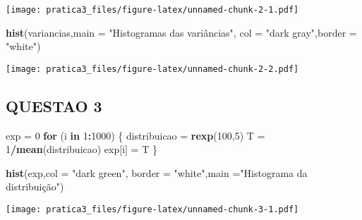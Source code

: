 \documentclass[]{article}
\newenvironment{Shaded}{\begin{snugshade}}{\end{snugshade}}
\newcommand{\KeywordTok}[1]{\textcolor[rgb]{0.13,0.29,0.53}{\textbf{#1}}}
\newcommand{\DataTypeTok}[1]{\textcolor[rgb]{0.13,0.29,0.53}{#1}}
\newcommand{\DecValTok}[1]{\textcolor[rgb]{0.00,0.00,0.81}{#1}}
\newcommand{\StringTok}[1]{\textcolor[rgb]{0.31,0.60,0.02}{#1}}
\newcommand{\ControlFlowTok}[1]{\textcolor[rgb]{0.13,0.29,0.53}{\textbf{#1}}}
\newcommand{\OperatorTok}[1]{\textcolor[rgb]{0.81,0.36,0.00}{\textbf{#1}}}
\newcommand{\NormalTok}[1]{#1}
\begin{document}
\texttt{[image: pratica3\_files/figure-latex/unnamed-chunk-2-1.pdf]}

\begin{Shaded}
\begin{Highlighting}[]
\KeywordTok{hist}\NormalTok{(variancias,}\DataTypeTok{main =} \StringTok{"Histogramas das variâncias"}\NormalTok{, }\DataTypeTok{col =} \StringTok{"dark gray"}\NormalTok{,}\DataTypeTok{border =} \StringTok{"white"}\NormalTok{)}
\end{Highlighting}
\end{Shaded}

\texttt{[image: pratica3\_files/figure-latex/unnamed-chunk-2-2.pdf]}

\subsection{QUESTAO 3}\label{questao-3}

\begin{Shaded}
\begin{Highlighting}[]
\NormalTok{exp =}\StringTok{ }\DecValTok{0}
\ControlFlowTok{for}\NormalTok{ (i }\ControlFlowTok{in} \DecValTok{1}\OperatorTok{:}\DecValTok{1000}\NormalTok{) \{}
\NormalTok{  distribuicao =}\StringTok{ }\KeywordTok{rexp}\NormalTok{(}\DecValTok{100}\NormalTok{,}\DecValTok{5}\NormalTok{)}
\NormalTok{  T =}\StringTok{ }\DecValTok{1}\OperatorTok{/}\KeywordTok{mean}\NormalTok{(distribuicao)}
\NormalTok{  exp[i] =}\StringTok{ }\NormalTok{T}
\NormalTok{\}}

\KeywordTok{hist}\NormalTok{(exp,}\DataTypeTok{col =} \StringTok{"dark green"}\NormalTok{, }\DataTypeTok{border =} \StringTok{"white"}\NormalTok{,}\DataTypeTok{main =}\StringTok{"Histograma da distribuição"}\NormalTok{)}
\end{Highlighting}
\end{Shaded}

\texttt{[image: pratica3\_files/figure-latex/unnamed-chunk-3-1.pdf]}
\end{document}
